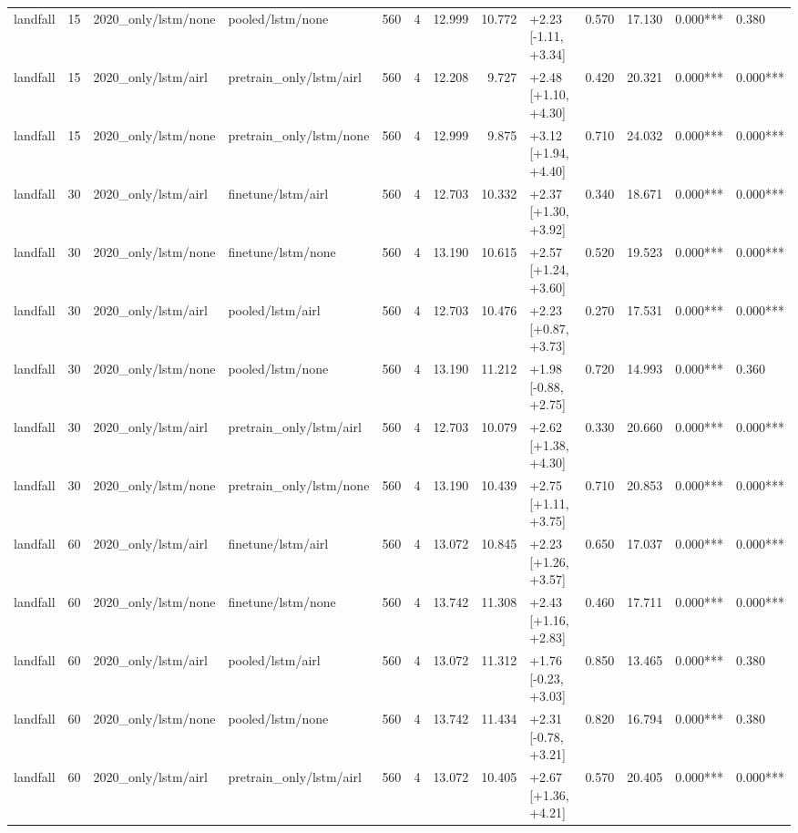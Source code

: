 \begin{tabular}{lrllrrrrlrrll}
landfall & 15 & 2020_only/lstm/none & pooled/lstm/none & 560 & 4 & 12.999 & 10.772 & +2.23 [-1.11, +3.34] & 0.570 & 17.130 & 0.000*** & 0.380 \\
landfall & 15 & 2020_only/lstm/airl & pretrain_only/lstm/airl & 560 & 4 & 12.208 & 9.727 & +2.48 [+1.10, +4.30] & 0.420 & 20.321 & 0.000*** & 0.000*** \\
landfall & 15 & 2020_only/lstm/none & pretrain_only/lstm/none & 560 & 4 & 12.999 & 9.875 & +3.12 [+1.94, +4.40] & 0.710 & 24.032 & 0.000*** & 0.000*** \\
landfall & 30 & 2020_only/lstm/airl & finetune/lstm/airl & 560 & 4 & 12.703 & 10.332 & +2.37 [+1.30, +3.92] & 0.340 & 18.671 & 0.000*** & 0.000*** \\
landfall & 30 & 2020_only/lstm/none & finetune/lstm/none & 560 & 4 & 13.190 & 10.615 & +2.57 [+1.24, +3.60] & 0.520 & 19.523 & 0.000*** & 0.000*** \\
landfall & 30 & 2020_only/lstm/airl & pooled/lstm/airl & 560 & 4 & 12.703 & 10.476 & +2.23 [+0.87, +3.73] & 0.270 & 17.531 & 0.000*** & 0.000*** \\
landfall & 30 & 2020_only/lstm/none & pooled/lstm/none & 560 & 4 & 13.190 & 11.212 & +1.98 [-0.88, +2.75] & 0.720 & 14.993 & 0.000*** & 0.360 \\
landfall & 30 & 2020_only/lstm/airl & pretrain_only/lstm/airl & 560 & 4 & 12.703 & 10.079 & +2.62 [+1.38, +4.30] & 0.330 & 20.660 & 0.000*** & 0.000*** \\
landfall & 30 & 2020_only/lstm/none & pretrain_only/lstm/none & 560 & 4 & 13.190 & 10.439 & +2.75 [+1.11, +3.75] & 0.710 & 20.853 & 0.000*** & 0.000*** \\
landfall & 60 & 2020_only/lstm/airl & finetune/lstm/airl & 560 & 4 & 13.072 & 10.845 & +2.23 [+1.26, +3.57] & 0.650 & 17.037 & 0.000*** & 0.000*** \\
landfall & 60 & 2020_only/lstm/none & finetune/lstm/none & 560 & 4 & 13.742 & 11.308 & +2.43 [+1.16, +2.83] & 0.460 & 17.711 & 0.000*** & 0.000*** \\
landfall & 60 & 2020_only/lstm/airl & pooled/lstm/airl & 560 & 4 & 13.072 & 11.312 & +1.76 [-0.23, +3.03] & 0.850 & 13.465 & 0.000*** & 0.380 \\
landfall & 60 & 2020_only/lstm/none & pooled/lstm/none & 560 & 4 & 13.742 & 11.434 & +2.31 [-0.78, +3.21] & 0.820 & 16.794 & 0.000*** & 0.380 \\
landfall & 60 & 2020_only/lstm/airl & pretrain_only/lstm/airl & 560 & 4 & 13.072 & 10.405 & +2.67 [+1.36, +4.21] & 0.570 & 20.405 & 0.000*** & 0.000*** \\

\end{tabular}
